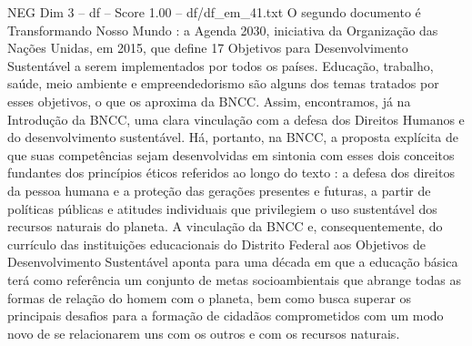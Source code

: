 \begin{textsample}{NEG Dim 3 – df – Score 1.00 – df/df\_em\_41.txt}
O segundo documento é Transformando Nosso Mundo : a Agenda 2030, iniciativa da Organização das Nações Unidas, em 2015, que define 17 Objetivos para Desenvolvimento Sustentável a serem implementados por todos os países.
Educação, trabalho, saúde, meio ambiente e empreendedorismo são alguns dos temas tratados por esses objetivos, o que os aproxima da BNCC.
Assim, encontramos, já na Introdução da BNCC, uma clara vinculação com a defesa dos Direitos Humanos e do desenvolvimento sustentável.
Há, portanto, na BNCC, a proposta explícita de que suas competências sejam desenvolvidas em sintonia com esses dois conceitos fundantes dos princípios éticos referidos ao longo do texto : a defesa dos direitos da pessoa humana e a proteção das gerações presentes e futuras, a partir de políticas públicas e atitudes individuais que privilegiem o uso sustentável dos recursos naturais do planeta.
A vinculação da BNCC e, consequentemente, do currículo das instituições educacionais do Distrito Federal aos Objetivos de Desenvolvimento Sustentável aponta para uma década em que a educação básica terá como referência um conjunto de metas socioambientais que abrange todas as formas de relação do homem com o planeta, bem como busca superar os principais desafios para a formação de cidadãos comprometidos com um modo novo de se relacionarem uns com os outros e com os recursos naturais.

\end{textsample}
